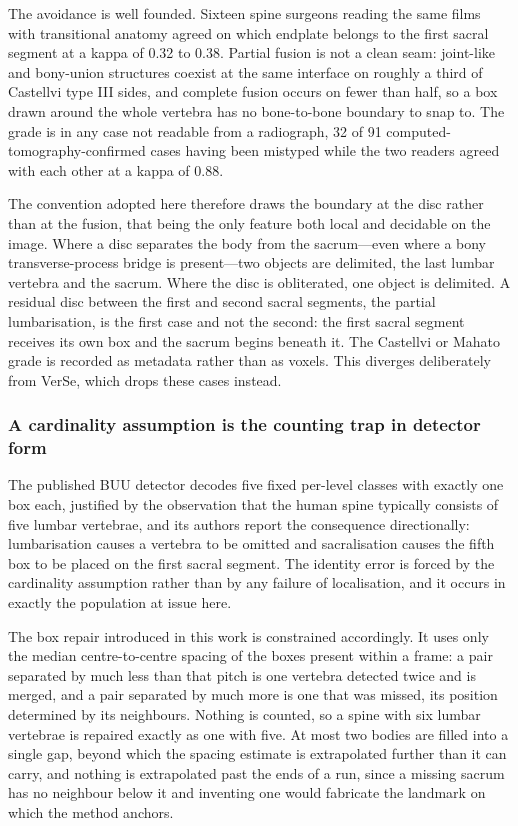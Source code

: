 \documentclass[11pt,letterpaper]{article}
\begin{document}
The avoidance is well founded. Sixteen spine surgeons reading the same films with transitional anatomy agreed on which endplate belongs to the first sacral segment at a kappa of 0.32 to 0.38. Partial fusion is not a clean seam: joint-like and bony-union structures coexist at the same interface on roughly a third of Castellvi type III sides, and complete fusion occurs on fewer than half, so a box drawn around the whole vertebra has no bone-to-bone boundary to snap to. The grade is in any case not readable from a radiograph, 32 of 91 computed-tomography-confirmed cases having been mistyped while the two readers agreed with each other at a kappa of 0.88.

The convention adopted here therefore draws the boundary at the disc rather than at the fusion, that being the only feature both local and decidable on the image. Where a disc separates the body from the sacrum---even where a bony transverse-process bridge is present---two objects are delimited, the last lumbar vertebra and the sacrum. Where the disc is obliterated, one object is delimited. A residual disc between the first and second sacral segments, the partial lumbarisation, is the first case and not the second: the first sacral segment receives its own box and the sacrum begins beneath it. The Castellvi or Mahato grade is recorded as metadata rather than as voxels. This diverges deliberately from VerSe, which drops these cases instead.


\subsubsection*{A cardinality assumption is the counting trap in detector form}
The published BUU detector decodes five fixed per-level classes with exactly one box each, justified by the observation that the human spine typically consists of five lumbar vertebrae, and its authors report the consequence directionally: lumbarisation causes a vertebra to be omitted and sacralisation causes the fifth box to be placed on the first sacral segment. The identity error is forced by the cardinality assumption rather than by any failure of localisation, and it occurs in exactly the population at issue here.

The box repair introduced in this work is constrained accordingly. It uses only the median centre-to-centre spacing of the boxes present within a frame: a pair separated by much less than that pitch is one vertebra detected twice and is merged, and a pair separated by much more is one that was missed, its position determined by its neighbours. Nothing is counted, so a spine with six lumbar vertebrae is repaired exactly as one with five. At most two bodies are filled into a single gap, beyond which the spacing estimate is extrapolated further than it can carry, and nothing is extrapolated past the ends of a run, since a missing sacrum has no neighbour below it and inventing one would fabricate the landmark on which the method anchors.
\end{document}
